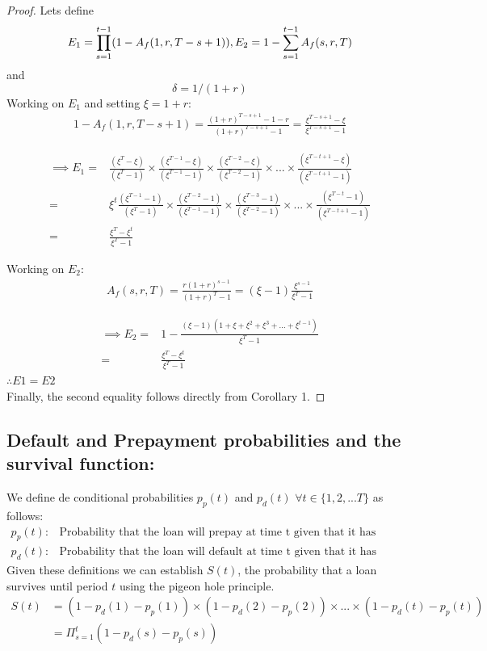 \begin{proof}{}{} Lets define
\[
E_1=\prod^{t-1}_{s=1}(1-A_f(1,r,T-s+1)), \\
E_2 =1-\sum^{t-1}_{s=1}A_f(s,r,T)
\]
and
\[
\delta =1/(1+r)
\]
Working on $E_1$ and setting $\xi=1+r$:
\begin{align}
1-A_f(1,r,T-s+1) = \frac{(1+r)^{T-s+1}-1-r}{(1+r)^{T-s+1}-1}=\frac{\xi^{T-s+1}-\xi}{\xi^{T-s+1}-1} \nonumber
\end{align}

\begin{align}
\implies E_1 =& \frac{(\xi^T-\xi)}{(\xi^T-1)}\times \frac{(\xi^{T-1}-\xi)}{(\xi^{T-1}-1)} \times \frac{(\xi^{T-2}-\xi)}{(\xi^{T-2}-1)} \times ... \times \frac{(\xi^{T-t+1}-\xi)}{(\xi^{T-t+1}-1)} \nonumber\\
=&\xi^t \frac{(\xi^{T-1}-1)}{(\xi^T-1)}\times \frac{(\xi^{T-2}-1)}{(\xi^{T-1}-1)} \times \frac{(\xi^{T-3}-1)}{(\xi^{T-2}-1)} \times ... \times \frac{(\xi^{T-t}-1)}{(\xi^{T-t+1}-1)} \nonumber\\
=&\frac{\xi^T-\xi^t}{\xi^T-1} \label{eq:e1}
\end{align}

Working on $E_2$:
\begin{align}
A_f(s,r,T) = \frac{r(1+r)^{s-1}}{(1+r)^{T}-1}=(\xi-1)\frac{\xi^{s-1}}{\xi^{T}-1} \nonumber
\end{align}

\begin{align}
\implies E_2 =& 1-\frac{(\xi-1)(1+\xi+\xi^2+\xi^3+...+\xi^{t-1})}{\xi^T-1}\nonumber\\
=&\frac{\xi^T-\xi^t}{\xi^T-1} 
\end{align}
$\therefore E1=E2$\\
Finally, the second equality follows directly from Corollary 1.
\end{proof}

\subsection{Default and Prepayment probabilities and the survival function:}
We define de conditional probabilities $p_p(t)$ and $p_d(t)$ $\forall t \in \{1,2,...T\}$ as follows:
\begin{align}
   p_p(t)  :&  \mbox{
   Probability that the loan will prepay at time t given that it has survived to that point } \nonumber \\
   p_d(t)  : &  \mbox{
   Probability that the loan will default at time t given that it has survived to that point 
   } \nonumber
\end{align} \noindent
 Given these definitions we can establish $S(t)$, the probability that a loan survives until period $t$ using the pigeon hole principle. 
\begin{align}
S(t) & = (1-p_d(1) - p_p(1))\times(1-p_d(2) - p_p(2))\times...\times(1-p_d(t) - p_p(t)) \nonumber\\ 
 & =  \Pi_{s=1}^t (1-p_d(s) - p_p(s))  
\end{align}



